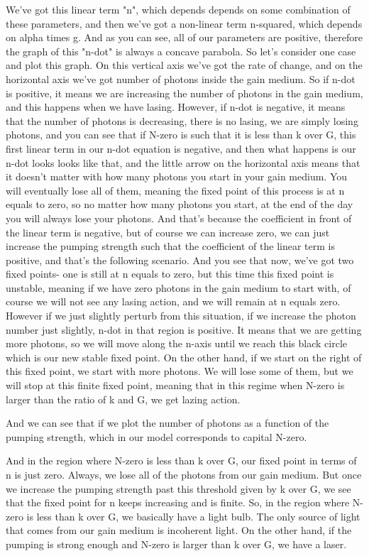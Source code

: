 We've got this linear term "n", which depends depends on some combination of these parameters, and then we've got a non-linear term n-squared, which depends on alpha times g. And as you can see, all of our parameters are positive, therefore the graph of this "n-dot" is always a concave parabola. So let's consider one case and plot this graph. On this vertical axis we've got the rate of change, and on the horizontal axis we've got number of photons inside the gain medium. So if n-dot is positive, it means we are increasing the number of photons in the gain medium, and this happens when we have lasing. However, if n-dot is negative, it means that the number of photons is decreasing, there is no lasing, we are simply losing photons, and you can see that if N-zero is such that it is less than k over G, this first linear term in our n-dot equation is negative, and then what happens is our n-dot looks looks like that, and the little arrow on the horizontal axis means that it doesn't matter with how many photons you start in your gain medium. You will eventually lose all of them, meaning the fixed point of this process is at n equals to zero, so no matter how many photons you start, at the end of the day you will always lose your photons. And that's because the coefficient in front of the linear term is negative, but of course we can increase zero, we can just increase the pumping strength such that the coefficient of the linear term is positive, and that's the following scenario. And you see that now, we've got two fixed points- one is still at n equals to zero, but this time this fixed point is unstable, meaning if we have zero photons in the gain medium to start with, of course we will not see any lasing action, and we will remain at n equals zero. However if we just slightly perturb from this situation, if we increase the photon number just slightly, n-dot in that region is positive. It means that we are getting more photons, so we will move along the n-axis until we reach this black circle which is our new stable fixed point. On the other hand, if we start on the right of this fixed point, we start with more photons. We will lose some of them, but we will stop at this finite fixed point, meaning that in this regime when N-zero is larger than the ratio of k and G, we get lazing action.

And we can see that if we plot the number of photons as a function of the pumping strength, which in our model corresponds to capital N-zero.

And in the region where N-zero is less than k over G, our fixed point in terms of n is just zero. Always, we lose all of the photons from our gain medium. But once we increase the pumping strength past this threshold given by k over G, we see that the fixed point for n keeps increasing and is finite. So, in the region where N-zero is less than k over G, we basically have a light bulb. The only source of light that comes from our gain medium is incoherent light. On the other hand, if the pumping is strong enough and N-zero is larger than k over G, we have a laser.

